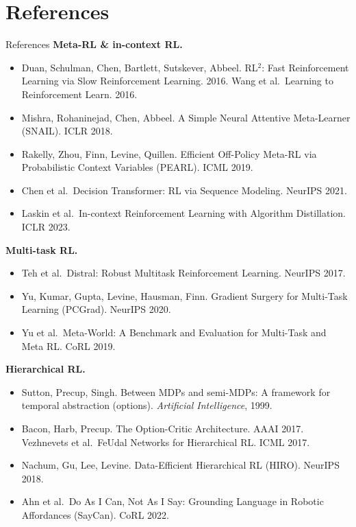 \section{References}

\begin{frame}[allowframebreaks]{References}
\footnotesize
\textbf{Meta-RL \& in-context RL.}
\begin{itemize}\itemsep0.15em
    \item Duan, Schulman, Chen, Bartlett, Sutskever, Abbeel. RL$^2$: Fast Reinforcement
          Learning via Slow Reinforcement Learning. 2016. \quad Wang et al.\ Learning to
          Reinforcement Learn. 2016.
    \item Mishra, Rohaninejad, Chen, Abbeel. A Simple Neural Attentive Meta-Learner
          (SNAIL). ICLR 2018.
    \item Rakelly, Zhou, Finn, Levine, Quillen. Efficient Off-Policy Meta-RL via
          Probabilistic Context Variables (PEARL). ICML 2019.
    \item Chen et al.\ Decision Transformer: RL via Sequence Modeling. NeurIPS 2021.
    \item Laskin et al.\ In-context Reinforcement Learning with Algorithm Distillation. ICLR 2023.
\end{itemize}
\textbf{Multi-task RL.}
\begin{itemize}\itemsep0.15em
    \item Teh et al.\ Distral: Robust Multitask Reinforcement Learning. NeurIPS 2017.
    \item Yu, Kumar, Gupta, Levine, Hausman, Finn. Gradient Surgery for Multi-Task Learning
          (PCGrad). NeurIPS 2020.
    \item Yu et al.\ Meta-World: A Benchmark and Evaluation for Multi-Task and Meta RL. CoRL 2019.
\end{itemize}
\textbf{Hierarchical RL.}
\begin{itemize}\itemsep0.15em
    \item Sutton, Precup, Singh. Between MDPs and semi-MDPs: A framework for temporal
          abstraction (options). \emph{Artificial Intelligence}, 1999.
    \item Bacon, Harb, Precup. The Option-Critic Architecture. AAAI 2017. \quad
          Vezhnevets et al.\ FeUdal Networks for Hierarchical RL. ICML 2017.
    \item Nachum, Gu, Lee, Levine. Data-Efficient Hierarchical RL (HIRO). NeurIPS 2018.
    \item Ahn et al.\ Do As I Can, Not As I Say: Grounding Language in Robotic Affordances
          (SayCan). CoRL 2022.
\end{itemize}


\end{frame}
